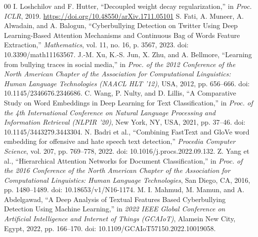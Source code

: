 \begin{thebibliography}{00}
 I. Loshchilov and F. Hutter, ``Decoupled weight decay regularization,'' in \textit{Proc. ICLR}, 2019. \url{https://doi.org/10.48550/arXiv.1711.05101}
 S. Fati, A. Muneer, A. Alwadain, and A. Balogun, ``Cyberbullying Detection on Twitter Using Deep Learning-Based Attention Mechanisms and Continuous Bag of Words Feature Extraction,'' \textit{Mathematics}, vol. 11, no. 16, p. 3567, 2023. doi: 10.3390/math11163567.
 J.-M. Xu, K.-S. Jun, X. Zhu, and A. Bellmore, ``Learning from bullying traces in social media,'' in \textit{Proc. of the 2012 Conference of the North American Chapter of the Association for Computational Linguistics: Human Language Technologies (NAACL HLT '12)}, USA, 2012, pp. 656--666. doi: 10.1145/2346676.2346686.
 C. Wang, P. Nulty, and D. Lillis, ``A Comparative Study on Word Embeddings in Deep Learning for Text Classification,'' in \textit{Proc. of the 4th International Conference on Natural Language Processing and Information Retrieval (NLPIR '20)}, New York, NY, USA, 2021, pp. 37--46. doi: 10.1145/3443279.3443304.
 N. Badri et al., ``Combining FastText and GloVe word embedding for offensive and hate speech text detection,'' \textit{Procedia Computer Science}, vol. 207, pp. 769--778, 2022. doi: 10.1016/j.procs.2022.09.132.
 Z. Yang et al., ``Hierarchical Attention Networks for Document Classification,'' in \textit{Proc. of the 2016 Conference of the North American Chapter of the Association for Computational Linguistics: Human Language Technologies}, San Diego, CA, 2016, pp. 1480--1489. doi: 10.18653/v1/N16-1174.
 M. I. Mahmud, M. Mamun, and A. Abdelgawad, ``A Deep Analysis of Textual Features Based Cyberbullying Detection Using Machine Learning,'' in \textit{2022 IEEE Global Conference on Artificial Intelligence and Internet of Things (GCAIoT)}, Alamein New City, Egypt, 2022, pp. 166--170. doi: 10.1109/GCAIoT57150.2022.10019058.
\end{thebibliography}
